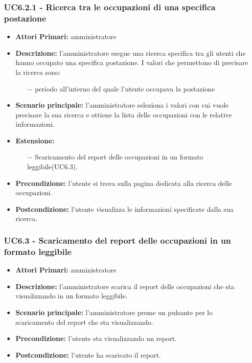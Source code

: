 \subsubsection{ UC6.2.1 - Ricerca tra le occupazioni di una specifica postazione}
\begin{itemize}
	\item\textbf{Attori Primari:} 
	amministratore
	\item\textbf{Descrizione:} 
	l'amministratore esegue una ricerca specifica tra gli utenti che hanno occupato una specifica postazione.
	I valori che permettono di precisare la ricerca sono:
	\begin{itemize}
		\item[$-$] periodo all'interno del quale l'utente occupava la postazione
	\end{itemize}
	\item\textbf{Scenario principale:} 
	l'amministratore seleziona i valori con cui vuole precisare la sua ricerca e ottiene la lista delle occupazioni con le relative informazioni.
	\item\textbf{Estensione:}
	\begin{itemize}
		\item[$-$] Scaricamento del report delle occupazioni in un formato leggibile(UC6.3).
	\end{itemize}
	\item\textbf{Precondizione:} 
	l'utente si trova sulla pagina dedicata alla ricerca delle occupazioni.
	\item\textbf{Postcondizione:}
	l'utente visualizza le informazioni specificate dalla sua ricerca.
\end{itemize}

\subsubsection{ UC6.3 - Scaricamento del report delle occupazioni in un formato leggibile}
\begin{itemize}
	\item\textbf{Attori Primari:} 
	amministratore
	\item\textbf{Descrizione:} 
	l'amministratore scarica il report delle occupazioni che sta visualizzando in un formato leggibile.
	\item\textbf{Scenario principale:} 
	l'amministratore preme un pulsante per lo scaricamento del report che sta visualizzando.
	\item\textbf{Precondizione:} 
	l'utente sta visualizzando un report.
	\item\textbf{Postcondizione:}
	l'utente ha scaricato il report.
\end{itemize}

